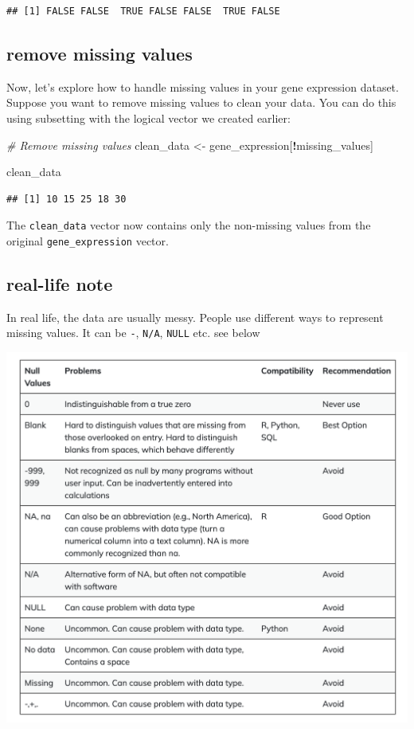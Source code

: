 \documentclass[
]{book}
\newenvironment{Shaded}{\begin{snugshade}}{\end{snugshade}}
\newcommand{\CommentTok}[1]{\textcolor[rgb]{0.56,0.35,0.01}{\textit{#1}}}
\newcommand{\NormalTok}[1]{#1}
\newcommand{\OtherTok}[1]{\textcolor[rgb]{0.56,0.35,0.01}{#1}}
\newcommand{\SpecialCharTok}[1]{\textcolor[rgb]{0.81,0.36,0.00}{\textbf{#1}}}
\begin{document}
\begin{verbatim}
## [1] FALSE FALSE  TRUE FALSE FALSE  TRUE FALSE
\end{verbatim}

\hypertarget{remove-missing-values}{%
\subsection{remove missing values}\label{remove-missing-values}}

Now, let's explore how to handle missing values in your gene expression dataset. Suppose you want to remove missing values to clean your data. You can do this using subsetting with the logical vector we created earlier:

\begin{Shaded}
\begin{Highlighting}[]
\CommentTok{\# Remove missing values}
\NormalTok{clean\_data }\OtherTok{\textless{}{-}}\NormalTok{ gene\_expression[}\SpecialCharTok{!}\NormalTok{missing\_values]}

\NormalTok{clean\_data}
\end{Highlighting}
\end{Shaded}

\begin{verbatim}
## [1] 10 15 25 18 30
\end{verbatim}

The \texttt{clean\_data} vector now contains only the non-missing values from the original \texttt{gene\_expression} vector.

\hypertarget{real-life-note}{%
\subsection{real-life note}\label{real-life-note}}

In real life, the data are usually messy. People use different ways to represent missing values. It can be \texttt{-}, \texttt{N/A}, \texttt{NULL} etc. see below

\includegraphics{images/NA.png}
\end{document}
